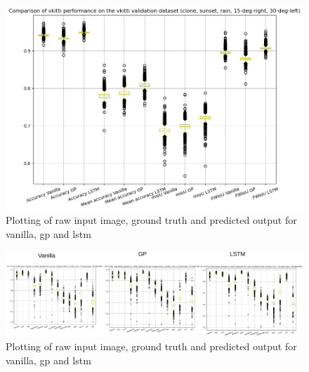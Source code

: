	\begin{figure}[h]
		\centering
		\includegraphics[width=12cm]{images/vkitti_validation_data_five_class_box_plot.png}
		\caption{Plotting of raw input image, ground truth and predicted output for vanilla, gp and lstm}
		\label{fig:performance_metric_unet}
	\end{figure}
	
	\begin{figure}
		\centering
		\includegraphics[width=19cm]{images/IoU_five.png}
		\caption{Plotting of raw input image, ground truth and predicted output for vanilla, gp and lstm}
		\label{fig:performance_metric_three_classes_unet_five}
	\end{figure}
	
